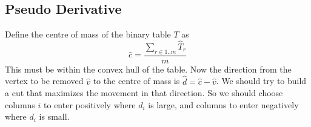 \documentclass{article}
\newcounter{excount}
\newenvironment{example}{\begin{quote}\refstepcounter{excount}\textbf{Example~\arabic{excount}:}}{\hfill$\qed$\end{quote}}
\newcommand{\pjs}[1]{\textcolor{blue}{\textsc{Pjs:} #1}}
\newcommand{\ignore}[1]{}
\begin{document}
\subsection{Pseudo Derivative}

Define the centre of mass of the binary table $T$
as
$$
\hat{c} = \frac{\sum_{r \in 1..m} \hat{T}_r}{m}
$$
This must be within the convex hull of the table.
Now the direction from the vertex to be removed $\hat{v}$ to the centre of mass is
$\hat{d} = \hat{c} - \hat{v}$.
We should try to build a cut that maximizes the movement in that direction. 
So we should choose columns $i$
to enter positively where $d_i$ is large, 
and columns to enter negatively where $d_i$ is small.



\ignore{
\subsection{Lifting Coefficients?}

How can we take advantage of the coefficients to generate stronger INTEGER cuts, and ideally also
REAL cuts. 


\paragraph{Multiplicative lifting}
\pjs{Turns out its probably useless!}

Suppose that $\sum_{i\in S} a_i b_i \leq k$ where $a_i > 0, i \in S$ 
is a valid cut, then the following constraint for any $L > 0$
is equivalent (in the integers) 
$\sum_{i\in S} L a_i b_i \leq L k + (L-1)$ 
but not in the reals so this may be bad for MIP.
\pjs{The hint is here, the constraint is EQUIVALENT in the integers, but why does cover lifting not strengthen the result!}

\begin{example}
    Consider the constraint of Example~\ref{ex:lift}, 
    $b_2 + b_4 + b_6 \leq 1$ this is equivalent to 
    $3 b_2 + 3 b_4 + 3 b_6 \leq 5$. 
    Now we could lift in using cover lifting all variables since there are never more than 2 others true (since its 3 integers). We get
$b_1 + 3b_2 + b_3 + 3b_4 + b_5 + 3 b_6 + b_7 + b_8 + b_9 + b_{10} \leq 5$.
This might be good for PB, but probably not for MIP?
\end{example}



You can always take any correct cut and multiply to lift in all variables if you so desire. 

}
\end{document}
